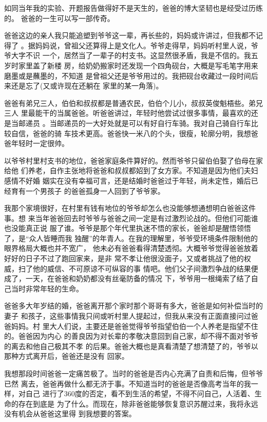 \documentclass[12pt]{book}
\begin{document}
如同当年我的实验、开题报告做得好不是天生的，爸爸的博大坚韧也是经受过历练的。
爸爸的一生可以写一部传奇。

爸爸这边的亲人我只能追塑到爷爷这一辈，再长些的，妈妈或许讲过，但我都不记得了
。据妈妈说，曾祖父还算得上是文化人。爷爷走得早，妈妈听村里人说，爷爷大字不识
一个，居然当了一辈子的村支书。这显然很矛盾，我是不信的。我五岁时家里盖了新楼
房，给奶奶搬家时还发现一个四角砚台，大概是写毛笔字用来磨墨或是蘸墨的，不知道
是曾祖父还是爷爷用过的。我把砚台收藏过一段时间后来还是忘了(又或许现在还躺在
家里的某一角落)。

爸爸有弟兄三人，伯伯和叔叔都是普通农民，伯伯个儿小，叔叔英俊魁梧些。弟兄三人
里最能干的当属爸爸。听爸爸讲过，年轻时他尝试过很多事情，最喜欢的还是当邮递员
。当邮递员的一大好处就是可以有好自行车骑。我对自己骑自行车比较自信，爸爸的骑
车技术更高。爸爸快一米八的个头，很瘦，轮廓分明，我想爸爸年轻时一定很帅。

以爷爷村里村支书的地位，爸爸家庭条件算好的。然而爷爷只留伯伯娶了伯母在家给他
们养老，自作主张地将爸爸和叔叔都妱到了女方家。不知道是因为他们夫妇感情不好婚
姻实在没有幸福可言，还是结婚时爸爸过于年轻，尚未定性，婚后已经育有一个男孩子
的爸爸孤身一人回到了爷爷家。

我那个家境很好，在村里有钱有地位的爷爷却怎么也没能够想通想明白爸爸这件事。想
来当年爸爸回去时爷爷与爸爸之间一定是有过激烈论战的。但他们可能谁也没能真正说
服了谁。爷爷是那个年代里执迷不悟的家长，爸爸却是醒悟领悟了，是“众人皆睡而我
独醒”的年青人。在我的理解里，爷爷受环境条件限制他的眼界格局大概也并不宽广，
他未必有爸爸看得清楚透彻。大概爷爷觉得爸爸放着好好的日子不过了跑回家来，是非
常不孝让他很没面子，又或者挑战了他的权威，扫了他的威信、不可原谅不可纵容的事
情吧。他们父子间激烈争战的结果便成了，一天，在爸爸和奶奶都没有丝毫防备的情况
下，爷爷用一根绳索了结了自己当时非常年轻的生命。

爸爸多大年岁结的婚，爸爸离开那个家时那个哥哥有多大，爸爸是如何补偿当时的妻子
和孩子，这些事情我只间或听村里人提起过，但我从来没有正面直接问过爸爸妈妈。村
里大人们说，主要还是爸爸觉得爷爷指望伯伯一个人养老是指望不住的。爸爸因为内心
的善良因为对长辈的孝敬决意回到自己家，却不得不面对爷爷的离去和他自己极其不孝
的后果。爸爸大概也是真看清楚了想清楚了的，爷爷以那种方式离开后，爸爸还是没有
回家。

我想那段时间爸爸一定痛苦极了。当时的爸爸是否内心充满了自责和后悔，但爷爷已然
离去，爸爸再做什么都无济于事。不知道当时的爸爸是否像高考当年的我一样，对自己
进行了360度的否定，看不到生活的希望，不得不问自己，人活着、生命的存在到底是
为了什么。而现在，除非爸爸能够恢复意识苏醒过来，我将永远没有机会从爸爸这里得
到我想要的答案。
\end{document}
